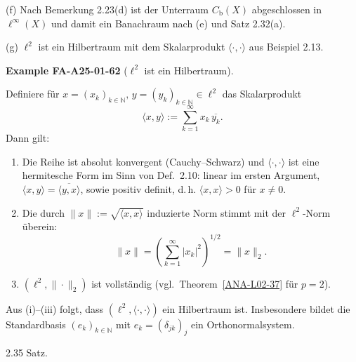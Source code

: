 \documentclass[10pt, letterpaper]{article}
\newcommand{\CustomHeading}[3]{%
  \par\medskip\noindent%
  \textbf{#1 #2} \textnormal{(#3)}.\enskip%
}
\newenvironment{EXA}[2]{\begin{unitbox}\CustomHeading{Example}{#1}{#2}}{\end{unitbox}}
\begin{document}
(f) Nach Bemerkung 2.23(d) ist der Unterraum $C_{\mathrm{b}}(X)$ abgeschlossen in $\ell^{\infty}(X)$ und damit ein Banachraum nach (e) und Satz 2.32(a).




(g) $\ell^{2}$ ist ein Hilbertraum mit dem Skalarprodukt $\langle\cdot, \cdot\rangle$ aus Beispiel 2.13.\\



\begin{EXA}{FA-A25-01-62}{$\ell^{2}$ ist ein Hilbertraum}
Definiere für $x=(x_k)_{k\in\mathbb{N}},\,y=(y_k)_{k\in\mathbb{N}}\in\ell^{2}$ das Skalarprodukt
\[
\langle x,y\rangle := \sum_{k=1}^{\infty} x_k\,\overline{y_k}.
\]
Dann gilt:
\begin{enumerate}
\item[(i)] Die Reihe ist absolut konvergent (Cauchy–Schwarz) und $\langle\cdot,\cdot\rangle$ ist eine hermitesche Form im Sinn von Def.~2.10: linear im ersten Argument, $\langle x,y\rangle=\overline{\langle y,x\rangle}$, sowie positiv definit, d.\,h. $\langle x,x\rangle>0$ für $x\neq 0$.
\item[(ii)] Die durch $\|x\|:=\sqrt{\langle x,x\rangle}$ induzierte Norm stimmt mit der $\ell^{2}$-Norm überein:
\[
\|x\|=\left(\sum_{k=1}^{\infty}|x_k|^{2}\right)^{1/2}=\|x\|_{2}.
\]
\item[(iii)] $(\ell^{2},\|\cdot\|_{2})$ ist vollständig (vgl.\ Theorem~\ref{ANA-L02-37} für $p=2$).
\end{enumerate}
Aus (i)–(iii) folgt, dass $(\ell^{2},\langle\cdot,\cdot\rangle)$ ein Hilbertraum ist. 
Insbesondere bildet die Standardbasis $(e_k)_{k\in\mathbb{N}}$ mit $e_k=(\delta_{jk})_{j}$ ein Orthonormalsystem.
\end{EXA}




2.35 Satz. 
\end{document}
